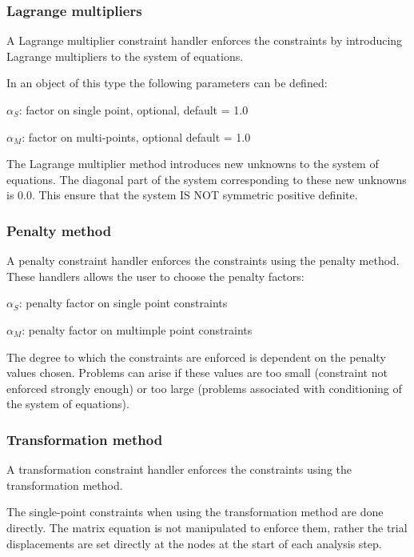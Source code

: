 \subsubsection{Lagrange multipliers}
A Lagrange multiplier constraint handler enforces the constraints by introducing Lagrange multipliers to the system of equations.

In an object of this type the following parameters can be defined:

\begin{description}
  \item{$\alpha_S$}: factor on single point, optional, default = 1.0
  \item{$\alpha_M$}: factor on multi-points, optional default = 1.0 
\end{description}

The Lagrange multiplier method introduces new unknowns to the system of equations. The diagonal part of the system corresponding to these new unknowns is 0.0. This ensure that the system IS NOT symmetric positive definite.



\subsubsection{Penalty method}
A penalty constraint handler enforces the constraints using the penalty method. These handlers allows the user to choose the penalty factors:

\begin{description}
  \item{$\alpha_S$}: penalty factor on single point constraints
  \item{$\alpha_M$}: penalty factor on multimple point constraints
\end{description}

The degree to which the constraints are enforced is dependent on the penalty values chosen. Problems can arise if these values are too small (constraint not enforced strongly enough) or too large (problems associated with conditioning of the system of equations).

\subsubsection{Transformation method}
A transformation constraint handler enforces the constraints using the transformation method.

The single-point constraints when using the transformation method are done directly. The matrix equation is not manipulated to enforce them, rather the trial displacements are set directly at the nodes at the start of each analysis step.

